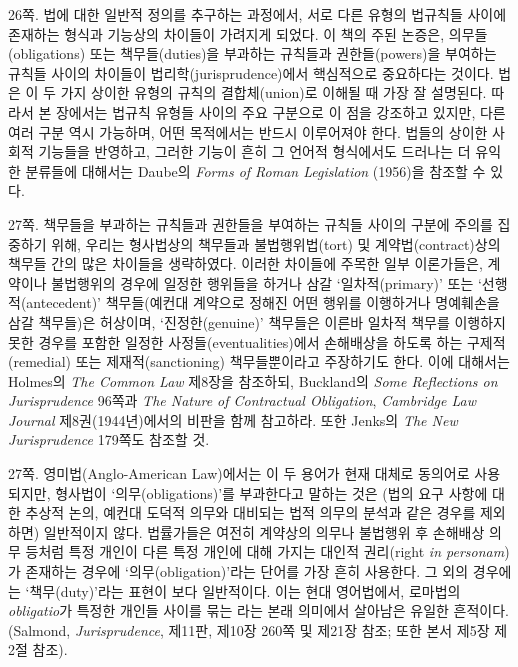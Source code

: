 {\footnotesize
\noteentry 26쪽.  법에 대한 일반적
정의를 추구하는 과정에서, 서로 다른 유형의 법규칙들 사이에 존재하는
형식과 기능상의 차이들이 가려지게 되었다. 이 책의 주된 논증은,
의무들(obligations) 또는 책무들(duties)을 부과하는 규칙들과
권한들(powers)을 부여하는 규칙들 사이의 차이들이
법리학(jurisprudence)에서 핵심적으로 중요하다는 것이다. 법은 이 두 가지
상이한 유형의 규칙의 결합체(union)로 이해될 때 가장 잘 설명된다. 따라서
본 장에서는 법규칙 유형들 사이의 주요 구분으로 이 점을 강조하고 있지만,
다른 여러 구분 역시 가능하며, 어떤 목적에서는 반드시 이루어져야 한다.
법들의 상이한 사회적 기능들을 반영하고, 그러한 기능이 흔히 그 언어적
형식에서도 드러나는 더 유익한 분류들에 대해서는 Daube의 \emph{Forms of
Roman Legislation} (1956)을 참조할 수 있다.

\noteentry 27쪽.  책무들을 부과하는 규칙들과 권한들을 부여하는 규칙들 사이의 구분에
주의를 집중하기 위해, 우리는 형사법상의 책무들과 불법행위법(tort) 및
계약법(contract)상의 책무들 간의 많은 차이들을 생략하였다. 이러한
차이들에 주목한 일부 이론가들은, 계약이나 불법행위의 경우에 일정한
행위들을 하거나 삼갈 ‘일차적(primary)’ 또는 ‘선행적(antecedent)’
책무들(예컨대 계약으로 정해진 어떤 행위를 이행하거나 명예훼손을 삼갈
책무들)은 허상이며, ‘진정한(genuine)’ 책무들은 이른바 일차적 책무를
이행하지 못한 경우를 포함한 일정한 사정들(eventualities)에서 손해배상을
하도록 하는 구제적(remedial) 또는 제재적(sanctioning) 책무들뿐이라고
주장하기도 한다. 이에 대해서는 Holmes의 \emph{The Common Law} 제8장을
참조하되, Buckland의 \emph{Some Reflections on Jurisprudence} 96쪽과
\emph{The Nature of Contractual Obligation}, \emph{Cambridge Law
Journal} 제8권(1944년)에서의 비판을 함께 참고하라. 또한 Jenks의
\emph{The New Jurisprudence} 179쪽도 참조할 것.

\noteentry 27쪽.  영미법(Anglo-American
Law)에서는 이 두 용어가 현재 대체로 동의어로 사용되지만, 형사법이
‘의무(obligations)’를 부과한다고 말하는 것은 (법의 요구 사항에 대한
추상적 논의, 예컨대 도덕적 의무와 대비되는 법적 의무의 분석과 같은
경우를 제외하면) 일반적이지 않다. 법률가들은 여전히 계약상의 의무나
불법행위 후 손해배상 의무 등처럼 특정 개인이 다른 특정 개인에 대해
가지는 대인적 권리(right \emph{in personam})가 존재하는 경우에
‘의무(obligation)’라는 단어를 가장 흔히 사용한다. 그 외의 경우에는
‘책무(duty)’라는 표현이 보다 일반적이다. 이는 현대 영어법에서, 로마법의
\emph{obligatio}가 특정한 개인들 사이를 묶는 라는 본래 의미에서 살아남은 유일한 흔적이다. (Salmond,
\emph{Jurisprudence}, 제11판, 제10장 260쪽 및 제21장 참조; 또한 본서
제5장 제2절 참조).

}
